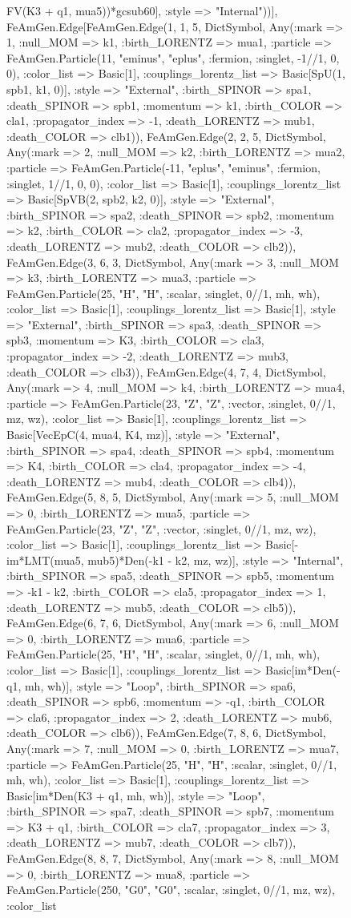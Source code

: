 \documentclass{revtex4}
\begin{document}
\begin{figure}[!htb]
\begin{center}
{FV(K3 + q1, mua5))*gcsub60], :style => "Internal"))], FeAmGen.Edge[FeAmGen.Edge(1, 1, 5, Dict{Symbol, Any}(:mark => 1, :null_MOM => k1, :birth_LORENTZ => mua1, :particle => FeAmGen.Particle(11, "eminus", "eplus", :fermion, :singlet, -1//1, 0, 0), :color_list => Basic[1], :couplings_lorentz_list => Basic[SpU(1, spb1, k1, 0)], :style => "External", :birth_SPINOR => spa1, :death_SPINOR => spb1, :momentum => k1, :birth_COLOR => cla1, :propagator_index => -1, :death_LORENTZ => mub1, :death_COLOR => clb1)), FeAmGen.Edge(2, 2, 5, Dict{Symbol, Any}(:mark => 2, :null_MOM => k2, :birth_LORENTZ => mua2, :particle => FeAmGen.Particle(-11, "eplus", "eminus", :fermion, :singlet, 1//1, 0, 0), :color_list => Basic[1], :couplings_lorentz_list => Basic[SpVB(2, spb2, k2, 0)], :style => "External", :birth_SPINOR => spa2, :death_SPINOR => spb2, :momentum => k2, :birth_COLOR => cla2, :propagator_index => -3, :death_LORENTZ => mub2, :death_COLOR => clb2)), FeAmGen.Edge(3, 6, 3, Dict{Symbol, Any}(:mark => 3, :null_MOM => k3, :birth_LORENTZ => mua3, :particle => FeAmGen.Particle(25, "H", "H", :scalar, :singlet, 0//1, mh, wh), :color_list => Basic[1], :couplings_lorentz_list => Basic[1], :style => "External", :birth_SPINOR => spa3, :death_SPINOR => spb3, :momentum => K3, :birth_COLOR => cla3, :propagator_index => -2, :death_LORENTZ => mub3, :death_COLOR => clb3)), FeAmGen.Edge(4, 7, 4, Dict{Symbol, Any}(:mark => 4, :null_MOM => k4, :birth_LORENTZ => mua4, :particle => FeAmGen.Particle(23, "Z", "Z", :vector, :singlet, 0//1, mz, wz), :color_list => Basic[1], :couplings_lorentz_list => Basic[VecEpC(4, mua4, K4, mz)], :style => "External", :birth_SPINOR => spa4, :death_SPINOR => spb4, :momentum => K4, :birth_COLOR => cla4, :propagator_index => -4, :death_LORENTZ => mub4, :death_COLOR => clb4)), FeAmGen.Edge(5, 8, 5, Dict{Symbol, Any}(:mark => 5, :null_MOM => 0, :birth_LORENTZ => mua5, :particle => FeAmGen.Particle(23, "Z", "Z", :vector, :singlet, 0//1, mz, wz), :color_list => Basic[1], :couplings_lorentz_list => Basic[-im*LMT(mua5, mub5)*Den(-k1 - k2, mz, wz)], :style => "Internal", :birth_SPINOR => spa5, :death_SPINOR => spb5, :momentum => -k1 - k2, :birth_COLOR => cla5, :propagator_index => 1, :death_LORENTZ => mub5, :death_COLOR => clb5)), FeAmGen.Edge(6, 7, 6, Dict{Symbol, Any}(:mark => 6, :null_MOM => 0, :birth_LORENTZ => mua6, :particle => FeAmGen.Particle(25, "H", "H", :scalar, :singlet, 0//1, mh, wh), :color_list => Basic[1], :couplings_lorentz_list => Basic[im*Den(-q1, mh, wh)], :style => "Loop", :birth_SPINOR => spa6, :death_SPINOR => spb6, :momentum => -q1, :birth_COLOR => cla6, :propagator_index => 2, :death_LORENTZ => mub6, :death_COLOR => clb6)), FeAmGen.Edge(7, 8, 6, Dict{Symbol, Any}(:mark => 7, :null_MOM => 0, :birth_LORENTZ => mua7, :particle => FeAmGen.Particle(25, "H", "H", :scalar, :singlet, 0//1, mh, wh), :color_list => Basic[1], :couplings_lorentz_list => Basic[im*Den(K3 + q1, mh, wh)], :style => "Loop", :birth_SPINOR => spa7, :death_SPINOR => spb7, :momentum => K3 + q1, :birth_COLOR => cla7, :propagator_index => 3, :death_LORENTZ => mub7, :death_COLOR => clb7)), FeAmGen.Edge(8, 8, 7, Dict{Symbol, Any}(:mark => 8, :null_MOM => 0, :birth_LORENTZ => mua8, :particle => FeAmGen.Particle(250, "G0", "G0", :scalar, :singlet, 0//1, mz, wz), :color_list }
\end{center}
\end{figure}
\end{document}
